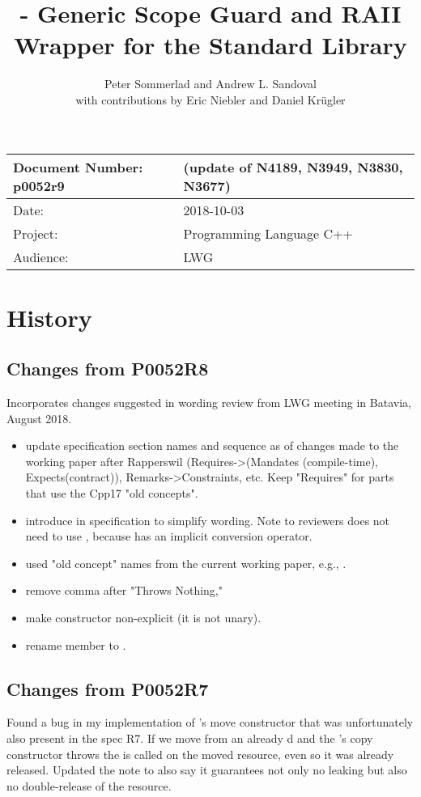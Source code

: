 \documentclass[ebook,11pt,article]{memoir}
\title{\papernumber{} - Generic Scope Guard and RAII Wrapper for the Standard Library}
\author{Peter Sommerlad and Andrew L. Sandoval\\with contributions by Eric Niebler and Daniel Kr\"ugler}
\date{\paperdate}                        %
\newcommand{\papernumber}{p0052r9}
\newcommand{\paperdate}{2018-10-03}
\begin{document}
\maketitle
\begin{tabular}[t]{|l|l|}\hline 
Document Number: \papernumber &   (update of N4189, N3949, N3830, N3677)\\\hline
Date: & \paperdate \\\hline
Project: & Programming Language C++\\\hline 
Audience: & LWG\\\hline
\end{tabular}

\chapter{History}
\section{Changes from P0052R8}
Incorporates changes suggested in wording review from LWG meeting in Batavia, August 2018.
\begin{itemize}
\item update specification section names and sequence as of changes made to the working paper after Rapperswil (Requires->(Mandates (compile-time), Expects(contract)), Remarks->Constraints, etc. Keep "Requires" for parts that use the Cpp17 "old concepts".
\item introduce \textit{} in  specification to simplify wording. Note to reviewers  does not need to use \textit{}, because  has an implicit conversion operator.
\item used "old concept" names from the current working paper, e.g., .
\item remove comma after "Throws Nothing,"
\item make  constructor non-explicit (it is not unary).
\item rename  member  to .
\end{itemize}


\section{Changes from P0052R7}
Found a bug in my implementation of 's move constructor that was unfortunately also present in the spec R7. If we move from an already d  and the 's copy constructor throws the  is called on the moved resource, even so it was already released. Updated the note to also say it guarantees not only no leaking but also no double-release of the resource.
\end{document}
